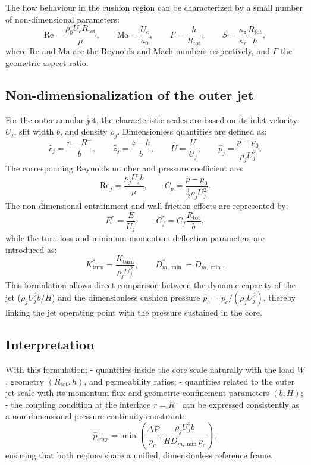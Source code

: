 \documentclass[11pt,a4paper]{article}
\begin{document}
The flow behaviour in the cushion region can be characterized by a small number of non-dimensional parameters:
\[
\mathrm{Re} = \frac{\rho_0 U_c R_{\mathrm{tot}}}{\mu}, \qquad
\mathrm{Ma} = \frac{U_c}{a_0}, \qquad
\Gamma = \frac{h}{R_{\mathrm{tot}}}, \qquad
S = \frac{\kappa_z}{\kappa_r} \frac{R_{\mathrm{tot}}}{h},
\]
where \(\mathrm{Re}\) and \(\mathrm{Ma}\) are the Reynolds and Mach numbers respectively, and \(\Gamma\) the geometric aspect ratio.

\subsection{Non-dimensionalization of the outer jet}

For the outer annular jet, the characteristic scales are based on its inlet velocity \(U_j\), slit width \(b\), and density \(\rho_j\).  
Dimensionless quantities are defined as:
\[
\hat{r}_j = \frac{r - R^{-}}{b}, \qquad
\hat{z}_j = \frac{z - h}{b}, \qquad
\hat{U} = \frac{U}{U_j}, \qquad
\hat{p}_j = \frac{p - p_0}{\rho_j U_j^2}.
\]
The corresponding Reynolds number and pressure coefficient are:
\[
\mathrm{Re}_j = \frac{\rho_j U_j b}{\mu}, \qquad
C_p = \frac{p - p_0}{\tfrac{1}{2}\rho_j U_j^2}.
\]
The non-dimensional entrainment and wall-friction effects are represented by:
\[
E^* = \frac{E}{U_j}, \qquad
C_f^* = C_f \frac{R_{\mathrm{tot}}}{b},
\]
while the turn-loss and minimum-momentum-deflection parameters are introduced as:
\[
K_{\mathrm{turn}}^* = \frac{K_{\mathrm{turn}}}{\rho_j U_j^2}, \qquad
D_{m,\min}^* = D_{m,\min}.
\]
This formulation allows direct comparison between the dynamic capacity of the jet
(\(\rho_j U_j^2 b / H\)) and the dimensionless cushion pressure \(\hat{p}_c = p_c / (\rho_j U_j^2)\),
thereby linking the jet operating point with the pressure sustained in the core.

\subsection{Interpretation}

With this formulation:
- quantities inside the core scale naturally with the load \(W\), geometry \((R_{\mathrm{tot}},h)\), and permeability ratios;
- quantities related to the outer jet scale with its momentum flux and geometric confinement parameters \((b,H)\);
- the coupling condition at the interface \(r = R^{-}\) can be expressed consistently as a non-dimensional pressure continuity constraint:
  \[
  \hat{p}_{\mathrm{edge}} = 
  \min\left( 
      \frac{\Delta P}{p_c}, 
      \frac{\rho_j U_j^2 b}{H D_{m,\min} p_c}
  \right),
  \]
  ensuring that both regions share a unified, dimensionless reference frame.
\end{document}

